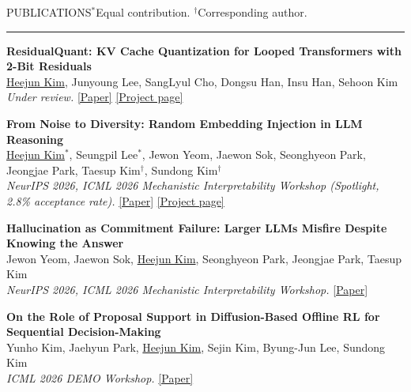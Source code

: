 \documentclass{resume} %
\renewenvironment{rSection}[2][]{
\vspace{-0.5 em} %
\sectionskip
\noindent\textcolor{RoyalPurple}{\MakeUppercase{#2}}\hfill{\footnotesize #1}\par
\sectionlineskip
\hrule
\begin{list}{}{
\setlength{\leftmargin}{1.5em}
}
\item[]
}{
\end{list}
}
\begin{document}
\begin{rSection}[$^{*}$Equal contribution. $^{\dagger}$Corresponding author.]{Publications}

\textbf{ResidualQuant: KV Cache Quantization for Looped Transformers with 2-Bit Residuals} \\
{\small \underline{Heejun Kim}, Junyoung Lee, SangLyul Cho, Dongsu Han, Insu Han, Sehoon Kim} \\
{\small \em Under review.} \href{https://arxiv.org/abs/2610.10381}{\small [Paper]} \href{https://seal-kaist.github.io/projects/ResidualQuant}{\small [Project page]}

\vspace{0.1em}

\textbf{From Noise to Diversity: Random Embedding Injection in LLM Reasoning} \\
{\small \underline{Heejun Kim}$^{*}$, Seungpil Lee$^{*}$, Jewon Yeom, Jaewon Sok, Seonghyeon Park, Jeongjae Park, Taesup Kim$^{\dagger}$, Sundong Kim$^{\dagger}$} \\
{\small \em NeurIPS 2026, \em ICML 2026 Mechanistic Interpretability Workshop (Spotlight, 2.8\% acceptance rate).} \href{https://arxiv.org/abs/2605.11936}{\small [Paper]} \href{https://heejunkim00.github.io/projects/RSP/}{\small [Project page]}

\vspace{0.1em}

\textbf{Hallucination as Commitment Failure: Larger LLMs Misfire Despite Knowing the Answer} \\
{\small Jewon Yeom, Jaewon Sok, \underline{Heejun Kim}, Seonghyeon Park, Jeongjae Park, Taesup Kim} \\
{\small \em NeurIPS 2026, \em ICML 2026 Mechanistic Interpretability Workshop.} \href{https://arxiv.org/abs/2605.22007}{\small [Paper]}

\vspace{0.1em}

\textbf{On the Role of Proposal Support in Diffusion-Based Offline RL for Sequential Decision-Making} \\
{\small Yunho Kim, Jaehyun Park, \underline{Heejun Kim}, Sejin Kim, Byung-Jun Lee, Sundong Kim} \\
{\small \em ICML 2026 DEMO Workshop.} \href{https://openreview.net/forum?id=roLdW7qeCO}{\small [Paper]}



\end{rSection}
\end{document}
